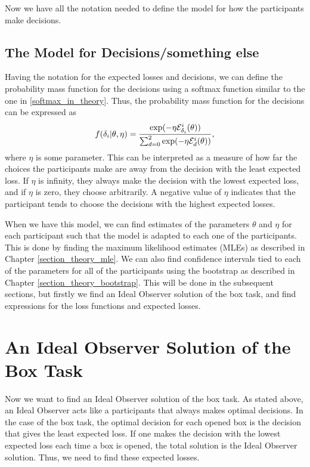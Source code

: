 Now we have all the notation needed to define the model for how the participants make decisions. 

\subsection{The Model for Decisions/something else}
Having the notation for the expected losses and decisions, we can define the probability mass function for the decisions using a softmax function similar to the one in \eqref{softmax_in_theory}. Thus, the probability mass function for the decisions can be expressed as
\begin{equation}
\label{softmax_real}
    f(\delta_{i}|\theta,\eta) = \frac{\text{exp}(- \eta \mathcal{E}^i_{\delta_{i}}(\theta))}{\sum_{d=0}^{2} \text{exp}(-\eta \mathcal{E}^i_{d}(\theta))},
\end{equation}
where $\eta$ is some parameter. This can be interpreted as a measure of how far the choices the participants make are away from the decision with the least expected loss. If $\eta$ is infinity, they always make the decision with the lowest expected loss, and if $\eta$ is zero, they choose arbitrarily. A negative value of $\eta$ indicates that the participant tends to choose the decisions with the highest expected losses.


When we have this model, we can find estimates of the parameters $\theta$ and $\eta$ for each participant such that the model is adapted to each one of the participants. This is done by finding the maximum likelihood estimates (MLEs) as described in Chapter \ref{section_theory_mle}. 
We can also find confidence intervals tied to each of the parameters for all of the participants using the bootstrap as described in Chapter \ref{section_theory_bootstrap}. This will be done in the subsequent sections, but firstly we find an Ideal Observer solution of the box task, and find expressions for the loss functions and expected losses. 


\section{An Ideal Observer Solution of the Box Task}
Now we want to find an Ideal Observer solution of the box task. As stated above, an Ideal Observer acts like a participants that always makes optimal decisions. In the case of the box task, the optimal decision for each opened box is the decision that gives the least expected loss. If one makes the decision with the lowest expected loss each time a box is opened, the total solution is the Ideal Observer solution. Thus, we need to find these expected losses. 

